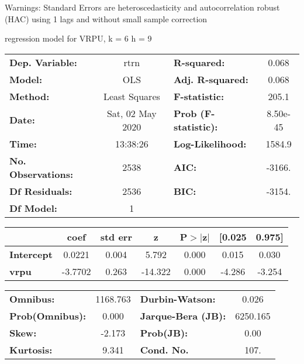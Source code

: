 Warnings: \newline
 [1] Standard Errors are heteroscedasticity and autocorrelation robust (HAC) using 1 lags and without small sample correction\ 

regression model for VRPU, k = 6 h = 9\begin{center}
\begin{tabular}{lclc}
\toprule
\textbf{Dep. Variable:}    &       rtrn       & \textbf{  R-squared:         } &     0.068   \\
\textbf{Model:}            &       OLS        & \textbf{  Adj. R-squared:    } &     0.068   \\
\textbf{Method:}           &  Least Squares   & \textbf{  F-statistic:       } &     205.1   \\
\textbf{Date:}             & Sat, 02 May 2020 & \textbf{  Prob (F-statistic):} &  8.50e-45   \\
\textbf{Time:}             &     13:38:26     & \textbf{  Log-Likelihood:    } &    1584.9   \\
\textbf{No. Observations:} &        2538      & \textbf{  AIC:               } &    -3166.   \\
\textbf{Df Residuals:}     &        2536      & \textbf{  BIC:               } &    -3154.   \\
\textbf{Df Model:}         &           1      & \textbf{                     } &             \\
\bottomrule
\end{tabular}
\begin{tabular}{lcccccc}
                   & \textbf{coef} & \textbf{std err} & \textbf{z} & \textbf{P$> |$z$|$} & \textbf{[0.025} & \textbf{0.975]}  \\
\midrule
\textbf{Intercept} &       0.0221  &        0.004     &     5.792  &         0.000        &        0.015    &        0.030     \\
\textbf{vrpu}      &      -3.7702  &        0.263     &   -14.322  &         0.000        &       -4.286    &       -3.254     \\
\bottomrule
\end{tabular}
\begin{tabular}{lclc}
\textbf{Omnibus:}       & 1168.763 & \textbf{  Durbin-Watson:     } &    0.026  \\
\textbf{Prob(Omnibus):} &   0.000  & \textbf{  Jarque-Bera (JB):  } & 6250.165  \\
\textbf{Skew:}          &  -2.173  & \textbf{  Prob(JB):          } &     0.00  \\
\textbf{Kurtosis:}      &   9.341  & \textbf{  Cond. No.          } &     107.  \\
\bottomrule
\end{tabular}
\end{center}


